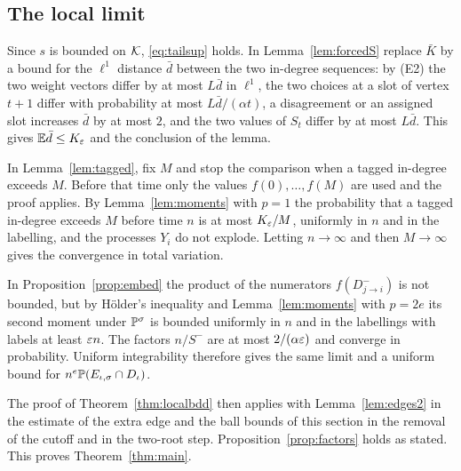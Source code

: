\subsection{The local limit}

Since $s$ is bounded on $\mathcal{K}$, \eqref{eq:tailsup} holds. In Lemma~\ref{lem:forcedS} replace $\bar K$ by a bound
for the $\ell^1$ distance $\bar d$ between the two in-degree sequences: by \textup{(E2)} the two weight vectors
differ by at most $L\bar d$ in $\ell^1$, the two choices at a slot of vertex $t+1$ differ with probability at most
$L\bar d/(\alpha t)$, a disagreement or an assigned slot increases $\bar d$ by at most $2$, and the two values of
$S_t$ differ by at most $L\bar d$. This gives $\mathbb{E}\bar d\le K_\varepsilon$ and the conclusion of the lemma.

In Lemma~\ref{lem:tagged}, fix $M$ and stop the comparison when a tagged in-degree exceeds $M$. Before that time
only the values $f(0),\dots,f(M)$ are used and the proof applies. By Lemma~\ref{lem:moments} with $p=1$ the
probability that a tagged in-degree exceeds $M$ before time $n$ is at most $K_\varepsilon/M$, uniformly in $n$ and in
the labelling, and the processes $Y_i$ do not explode. Letting $n\to\infty$ and then $M\to\infty$ gives the
convergence in total variation.

In Proposition~\ref{prop:embed} the product of the numerators $f(D^-_{j\to i})$ is not bounded, but by H\"older's
inequality and Lemma~\ref{lem:moments} with $p=2e$ its second moment under $\mathbb{P}^\sigma$ is bounded uniformly in
$n$ and in the labellings with labels at least $\varepsilon n$. The factors $n/S^-$ are at most $2/(\alpha\varepsilon)$ and
converge in probability. Uniform integrability therefore gives the same limit and a uniform bound for
$n^e\mathbb{P}(E_{\iota,\sigma}\cap D_\iota)$.

The proof of Theorem~\ref{thm:localbdd} then applies with Lemma~\ref{lem:edges2} in the estimate of the extra
edge and the ball bounds of this section in the removal of the cutoff and in the two-root step.
Proposition~\ref{prop:factors} holds as stated. This proves Theorem~\ref{thm:main}.
